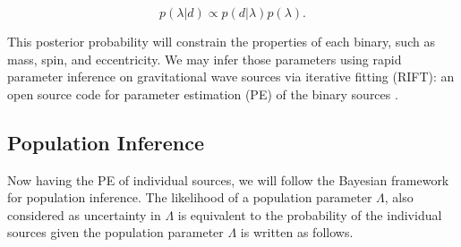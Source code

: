 \documentclass[twocolumn,prd,nofootinbib]{revtex4}
\begin{document}
\begin{equation}
\label{eq:Bayes_ind}    
p(\lambda|d) \propto p(d|\lambda) p(\lambda).
\end{equation}

This posterior probability will constrain the properties of each binary, such as mass, spin, and eccentricity. We may infer those parameters using rapid parameter inference on gravitational wave sources via iterative fitting (RIFT): an open source code for parameter estimation (PE) of the binary sources \cite{rift_2018}.



    


\subsection{Population Inference}

Now having the PE of individual sources, we will follow the Bayesian framework for population inference. The likelihood of a population parameter $\Lambda$, also considered as uncertainty in $\Lambda$ is equivalent to the probability of the individual sources given the population parameter $\Lambda$ is written as follows. 
\end{document}

